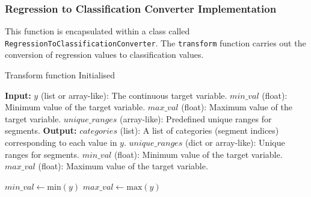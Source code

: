 \documentclass[a4paper, 12pt]{report}
\begin{document}
\subsubsection{Regression to Classification Converter Implementation}
This function is encapsulated within a class called \texttt{RegressionToClassificationConverter}. 
The \texttt{transform} function carries out the conversion of regression values to classification values.

\begin{algorithm}[H]
    \caption{Transform function Initialised}
    \begin{algorithmic}[1]
        \State \textbf{Input:} 
        \State $y$ (list or array-like): The continuous target variable.
        \State $min\_val$ (float): Minimum value of the target variable.
        \State $max\_val$ (float): Maximum value of the target variable.
        \State $unique\_ranges$ (array-like): Predefined unique ranges for segments.
        \State \textbf{Output:}
        \State $categories$ (list): A list of categories (segment indices) corresponding to each value in $y$.
        \State $unique\_ranges$ (dict or array-like): Unique ranges for segments.
        \State $min\_val$ (float): Minimum value of the target variable.
        \State $max\_val$ (float): Maximum value of the target variable.
        
            \State $min\_val \gets \text{min}(y)$
            \State $max\_val \gets \text{max}(y)$
        \EndIf
        \EndFunction
    \end{algorithmic}
\end{algorithm}
\clearpage
\end{document}
